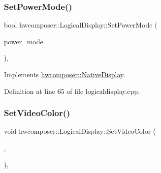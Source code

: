 \subsubsection{\texorpdfstring{Set\+Power\+Mode()}{SetPowerMode()}}
{\footnotesize\ttfamily bool hwcomposer\+::\+Logical\+Display\+::\+Set\+Power\+Mode (\begin{DoxyParamCaption}\item[{uint32\+\_\+t}]{power\+\_\+mode }\end{DoxyParamCaption})\hspace{0.3cm}{\ttfamily [override]}, {\ttfamily [virtual]}}



Implements \mbox{\hyperlink{classhwcomposer_1_1NativeDisplay_a9ea847cb1e75677fca7dabbcfb59a26a}{hwcomposer\+::\+Native\+Display}}.



Definition at line 65 of file logicaldisplay.\+cpp.


\begin{DoxyCode}{0}
\end{DoxyCode}
\mbox{\label{classhwcomposer_1_1LogicalDisplay_af963f6dd39bb6d7f043b6908ea5c64e5}} 
\subsubsection{\texorpdfstring{Set\+Video\+Color()}{SetVideoColor()}}
{\footnotesize\ttfamily void hwcomposer\+::\+Logical\+Display\+::\+Set\+Video\+Color (\begin{DoxyParamCaption}\item[{H\+W\+C\+Color\+Control}]{,  }\item[{float}]{ }\end{DoxyParamCaption})\hspace{0.3cm}{\ttfamily [override]}, {\ttfamily [virtual]}}

